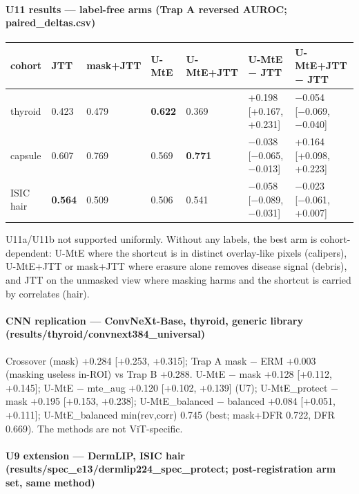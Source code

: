 {\paragraph{U11 results --- label-free arms (Trap A reversed AUROC; paired\_deltas.csv)}\label{u11-results--label-free-arms-trap-a-reversed-auroc-paired_deltascsv}

{ %
\begin{longtable}[]{@{}lllllll@{}}
\toprule\noalign{}
cohort & JTT & mask+JTT & U-MtE & U-MtE+JTT & U-MtE − JTT & U-MtE+JTT − JTT \\
\midrule\noalign{}
\endhead
\bottomrule\noalign{}
\endlastfoot
thyroid & 0.423 & 0.479 & \textbf{0.622} & 0.369 & +0.198 {[}+0.167, +0.231{]} & −0.054 {[}−0.069, −0.040{]} \\
capsule & 0.607 & 0.769 & 0.569 & \textbf{0.771} & −0.038 {[}−0.065, −0.013{]} & +0.164 {[}+0.098, +0.223{]} \\
ISIC hair & \textbf{0.564} & 0.509 & 0.506 & 0.541 & −0.058 {[}−0.089, −0.031{]} & −0.023 {[}−0.061, +0.007{]} \\
\end{longtable}
}

U11a/U11b not supported uniformly. Without any labels, the best arm is cohort-dependent: U-MtE where the shortcut is
in distinct overlay-like pixels (calipers), U-MtE+JTT or mask+JTT where erasure alone removes disease signal
(debris), and JTT on the unmasked view where masking harms and the shortcut is carried by correlates (hair).

\paragraph{CNN replication --- ConvNeXt-Base, thyroid, generic library (results/thyroid/convnext384\_universal)}\label{cnn-replication--convnext-base-thyroid-generic-library-resultsthyroidconvnext384_universal}

Crossover (mask) +0.284 {[}+0.253, +0.315{]}; Trap A mask − ERM +0.003 (masking useless in-ROI) vs Trap B +0.288.
U-MtE − mask +0.128 {[}+0.112, +0.145{]}; U-MtE − mte\_aug +0.120 {[}+0.102, +0.139{]} (U7); U-MtE\_protect − mask +0.195
{[}+0.153, +0.238{]}; U-MtE\_balanced − balanced +0.084 {[}+0.051, +0.111{]}; U-MtE\_balanced min(rev,corr) 0.745 (best;
mask+DFR 0.722, DFR 0.669). The methods are not ViT-specific.

\paragraph{U9 extension --- DermLIP, ISIC hair (results/spec\_e13/dermlip224\_spec\_protect; post-registration arm set, same method)}\label{u9-extension--dermlip-isic-hair-resultsspec_e13dermlip224_spec_protect-post-registration-arm-set-same-method}

}
